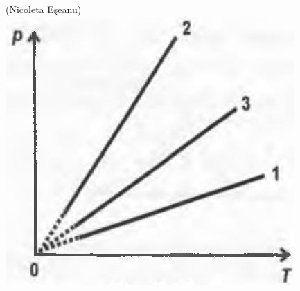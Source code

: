 \documentclass[10pt]{article}
\begin{document}
\begin{enumerate}
(Nicoleta Eşeanu)\\
\includegraphics[max width=\textwidth, center]{2025_07_01_5b3ff9fa0d508c8e9f17g-122}
\end{enumerate}
\end{document}
